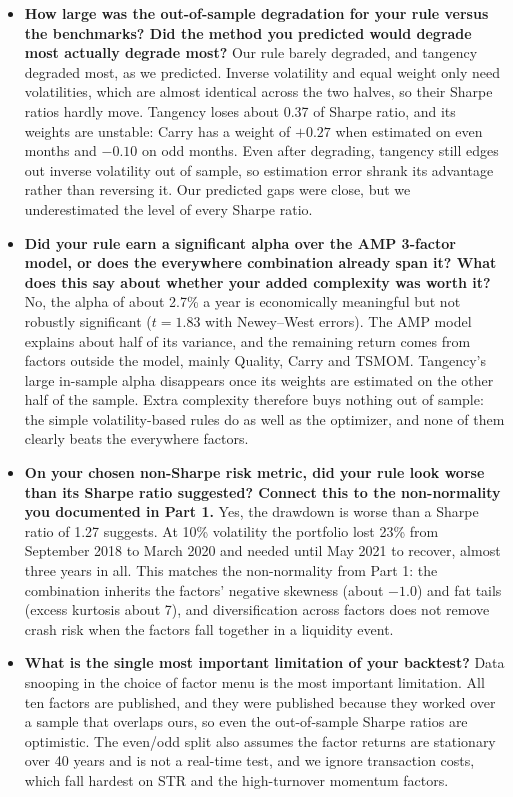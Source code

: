 \documentclass[11pt]{article}
\begin{document}
\begin{itemize}
\item \textbf{How large was the out-of-sample degradation for your rule versus the
benchmarks? Did the method you predicted would degrade most actually degrade most?} Our rule
barely degraded, and tangency degraded most, as we predicted. Inverse volatility and equal
weight only need volatilities, which are almost identical across the two halves, so their
Sharpe ratios hardly move. Tangency loses about 0.37 of Sharpe ratio, and its weights are
unstable: Carry has a weight of $+0.27$ when estimated on even months and $-0.10$ on odd
months. Even after degrading, tangency still edges out inverse volatility out of sample, so
estimation error shrank its advantage rather than reversing it. Our predicted gaps were close,
but we underestimated the level of every Sharpe ratio.

\item \textbf{Did your rule earn a significant alpha over the AMP 3-factor model, or does
the everywhere combination already span it? What does this say about whether your added
complexity was worth it?} No, the alpha of about 2.7\% a year is economically meaningful but
not robustly significant ($t=1.83$ with Newey--West errors). The AMP model explains about
half of its variance, and the remaining return comes from factors outside the model, mainly
Quality, Carry and TSMOM. Tangency's large in-sample alpha disappears once its weights are
estimated on the other half of the sample. Extra complexity therefore buys nothing out of
sample: the simple volatility-based rules do as well as the optimizer, and none of them
clearly beats the everywhere factors.

\item \textbf{On your chosen non-Sharpe risk metric, did your rule look worse than its
Sharpe ratio suggested? Connect this to the non-normality you documented in Part 1.} Yes,
the drawdown is worse than a Sharpe ratio of 1.27 suggests. At 10\% volatility the
portfolio lost 23\% from September 2018 to March 2020 and needed until May 2021 to recover,
almost three years in all. This matches the non-normality from Part 1: the combination
inherits the factors' negative skewness (about $-1.0$) and fat tails (excess kurtosis about
7), and diversification across factors does not remove crash risk when the factors fall
together in a liquidity event.

\item \textbf{What is the single most important limitation of your backtest?} Data snooping
in the choice of factor menu is the most important limitation. All ten factors are
published, and they were published because they worked over a sample that overlaps ours,
so even the out-of-sample Sharpe ratios are optimistic. The even/odd split also assumes the
factor returns are stationary over 40 years and is not a real-time test, and we ignore
transaction costs, which fall hardest on STR and the high-turnover momentum factors.
\end{itemize}
\end{document}
